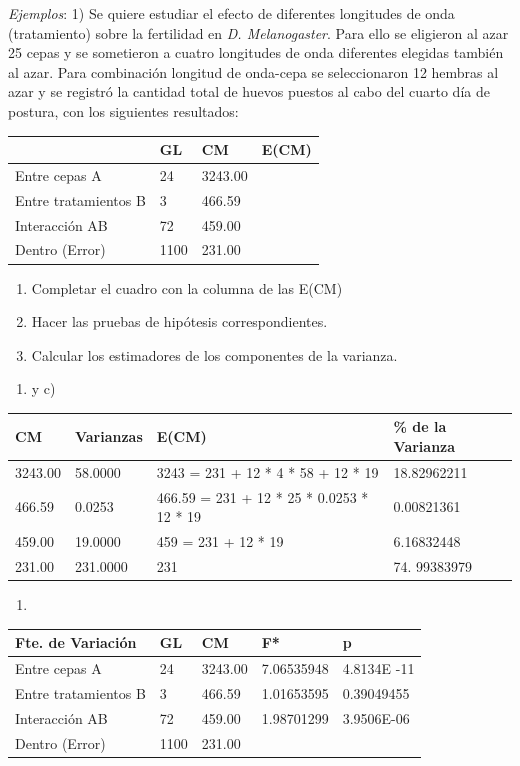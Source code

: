\documentclass[]{book}
\providecommand{\tightlist}{%
  \setlength{\itemsep}{0pt}\setlength{\parskip}{0pt}}
\theoremstyle{definition}
\theoremstyle{definition}
\theoremstyle{definition}
\theoremstyle{remark}
\begin{document}
\emph{Ejemplos}: 1) Se quiere estudiar el efecto de diferentes
longitudes de onda (tratamiento) sobre la fertilidad en \emph{D.
Melanogaster}. Para ello se eligieron al azar 25 cepas y se sometieron a
cuatro longitudes de onda diferentes elegidas también al azar. Para
combinación longitud de onda-cepa se seleccionaron 12 hembras al azar y
se registró la cantidad total de huevos puestos al cabo del cuarto día
de postura, con los siguientes resultados:

\begin{longtable}[]{@{}llll@{}}
\toprule
& GL & CM & E(CM)\tabularnewline
\midrule
\endhead
Entre cepas A & 24 & 3243.00 &\tabularnewline
Entre tratamientos B & 3 & 466.59 &\tabularnewline
Interacción AB & 72 & 459.00 &\tabularnewline
Dentro (Error) & 1100 & 231.00 &\tabularnewline
\bottomrule
\end{longtable}

\begin{enumerate}
\def\labelenumi{\arabic{enumi}.}
\item
  Completar el cuadro con la columna de las E(CM)
\item
  Hacer las pruebas de hipótesis correspondientes.
\item
  Calcular los estimadores de los componentes de la varianza.
\end{enumerate}

\begin{enumerate}
\def\labelenumi{\alph{enumi})}
\tightlist
\item
  y c)
\end{enumerate}

\begin{longtable}[]{@{}llll@{}}
\toprule
CM & \textbf{Varianzas} & E(CM) & \% de la Varianza\tabularnewline
\midrule
\endhead
3243.00 & 58.0000 & 3243 = 231 + 12 * 4 * 58 + 12 * 19 &
18.82962211\tabularnewline
466.59 & 0.0253 & 466.59 = 231 + 12 * 25 * 0.0253 * 12 * 19 &
0.00821361\tabularnewline
459.00 & 19.0000 & 459 = 231 + 12 * 19 & 6.16832448\tabularnewline
231.00 & 231.0000 & 231 & 74. 99383979\tabularnewline
\bottomrule
\end{longtable}

\begin{enumerate}
\def\labelenumi{\alph{enumi})}
\setcounter{enumi}{1}
\item
\end{enumerate}

\begin{longtable}[]{@{}lllll@{}}
\toprule
Fte. de Variación & \textbf{GL} & \textbf{CM} & F* & p\tabularnewline
\midrule
\endhead
Entre cepas A & 24 & 3243.00 & 7.06535948 & 4.8134E -11\tabularnewline
Entre tratamientos B & 3 & 466.59 & 1.01653595 &
0.39049455\tabularnewline
Interacción AB & 72 & 459.00 & 1.98701299 & 3.9506E-06\tabularnewline
Dentro (Error) & 1100 & 231.00 & &\tabularnewline
\bottomrule
\end{longtable}
\end{document}
